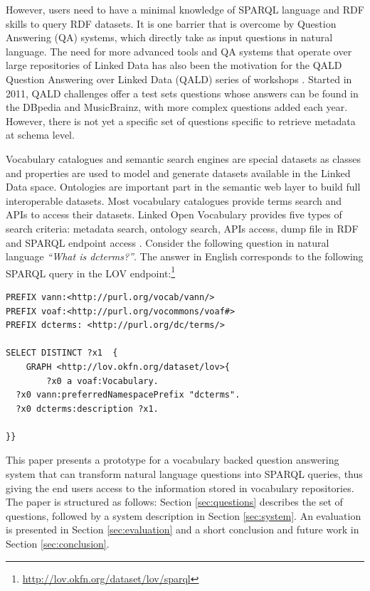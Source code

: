 \documentclass[runningheads,a4paper]{llncs}
\begin{document}
However, users need to have a minimal knowledge of SPARQL language and RDF skills to query  RDF datasets. It is one barrier that is overcome by Question Answering (QA) systems, which directly take as input questions in natural language. The need for more advanced tools and QA systems that operate over large repositories of Linked Data has also been the motivation for the QALD Question Answering over Linked Data (QALD) series of workshops \cite{lopezetal2013}. Started in 2011, QALD challenges offer a test sets questions whose answers can be found in the DBpedia and MusicBrainz, with more complex questions added each year. However, there is not yet a specific set of questions specific to retrieve metadata at schema level.
 
Vocabulary catalogues and semantic search engines are special datasets as classes and properties are used to model and generate datasets available in the Linked Data space. Ontologies are important part in the semantic web layer to build full interoperable datasets. Most vocabulary catalogues provide terms search and APIs to access their datasets. Linked Open Vocabulary provides five types of search criteria: metadata search, ontology search, APIs access, dump file in RDF and SPARQL endpoint access \cite{vandenbusschelov}.
Consider the following question in natural language \textit{``What is dcterms?''}. The answer in English corresponds to the following SPARQL query in the LOV endpoint:\footnote{\url{http://lov.okfn.org/dataset/lov/sparql}}

\begin{verbatim}
PREFIX vann:<http://purl.org/vocab/vann/>
PREFIX voaf:<http://purl.org/vocommons/voaf#>
PREFIX dcterms: <http://purl.org/dc/terms/>

SELECT DISTINCT ?x1  {
 	GRAPH <http://lov.okfn.org/dataset/lov>{
 	 	?x0 a voaf:Vocabulary.
  ?x0 vann:preferredNamespacePrefix "dcterms".
  ?x0 dcterms:description ?x1.
 	 
}}
\end{verbatim}


This paper presents a prototype for a vocabulary backed question answering system that can transform natural language questions into SPARQL queries, thus giving the end users access to the information stored in vocabulary repositories. The paper is structured as follows: Section \ref{sec:questions} describes the set of questions, followed by a system description in Section \ref{sec:system}. An evaluation is presented in Section \ref{sec:evaluation} and a short conclusion and future work in Section \ref{sec:conclusion}.  
\end{document}
